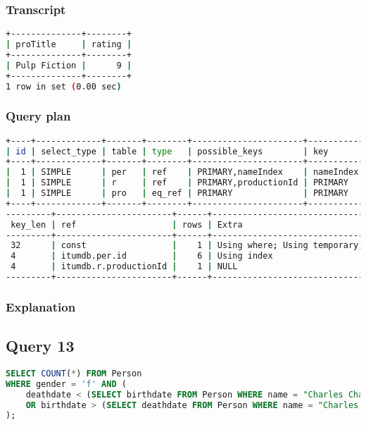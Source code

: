 \subsubsection{Transcript}
\begin{lstlisting}[language=bash]
+--------------+--------+
| proTitle     | rating |
+--------------+--------+
| Pulp Fiction |      9 |
+--------------+--------+
1 row in set (0.00 sec)
\end{lstlisting}

\subsubsection{Query plan}
\begin{lstlisting}[language=bash]
+----+-------------+-------+--------+----------------------+-----------+
| id | select_type | table | type   | possible_keys        | key       |
+----+-------------+-------+--------+----------------------+-----------+
|  1 | SIMPLE      | per   | ref    | PRIMARY,nameIndex    | nameIndex |
|  1 | SIMPLE      | r     | ref    | PRIMARY,productionId | PRIMARY   |
|  1 | SIMPLE      | pro   | eq_ref | PRIMARY              | PRIMARY   |
+----+-------------+-------+--------+----------------------+-----------+
---------+-----------------------+------+----------------------------------------------+
 key_len | ref                   | rows | Extra                                        |
---------+-----------------------+------+----------------------------------------------+
 32      | const                 |    1 | Using where; Using temporary; Using filesort |
 4       | itumdb.per.id         |    6 | Using index                                  |
 4       | itumdb.r.productionId |    1 | NULL                                         |
---------+-----------------------+------+----------------------------------------------+
\end{lstlisting}

\subsubsection{Explanation}


\subsection{Query 13}
\begin{lstlisting}[language=sql]
SELECT COUNT(*) FROM Person
WHERE gender = 'f' AND (
	deathdate < (SELECT birthdate FROM Person WHERE name = "Charles Chaplin")
	OR birthdate > (SELECT deathdate FROM Person WHERE name = "Charles Chaplin")
);
\end{lstlisting}

